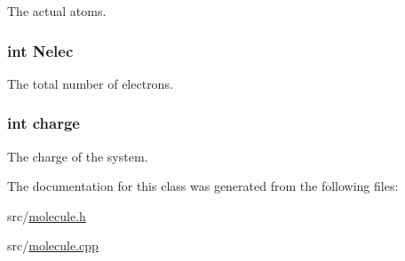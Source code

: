 The actual atoms. \hypertarget{classJKBuilder_1_1molecule__class_a849e4a1d5fee0c024e42b658d3babd02}{
\subsubsection[{Nelec}]{\setlength{\rightskip}{0pt plus 5cm}int {\bf Nelec}}}
\label{classJKBuilder_1_1molecule__class_a849e4a1d5fee0c024e42b658d3babd02}


The total number of electrons. \hypertarget{classJKBuilder_1_1molecule__class_ae8b866d74c9f0b8464b1aee9788c04eb}{
\subsubsection[{charge}]{\setlength{\rightskip}{0pt plus 5cm}int {\bf charge}}}
\label{classJKBuilder_1_1molecule__class_ae8b866d74c9f0b8464b1aee9788c04eb}


The charge of the system. 

The documentation for this class was generated from the following files:\begin{DoxyCompactItemize}
\item 
src/\hyperlink{molecule_8h}{molecule.h}\item 
src/\hyperlink{molecule_8cpp}{molecule.cpp}\end{DoxyCompactItemize}
